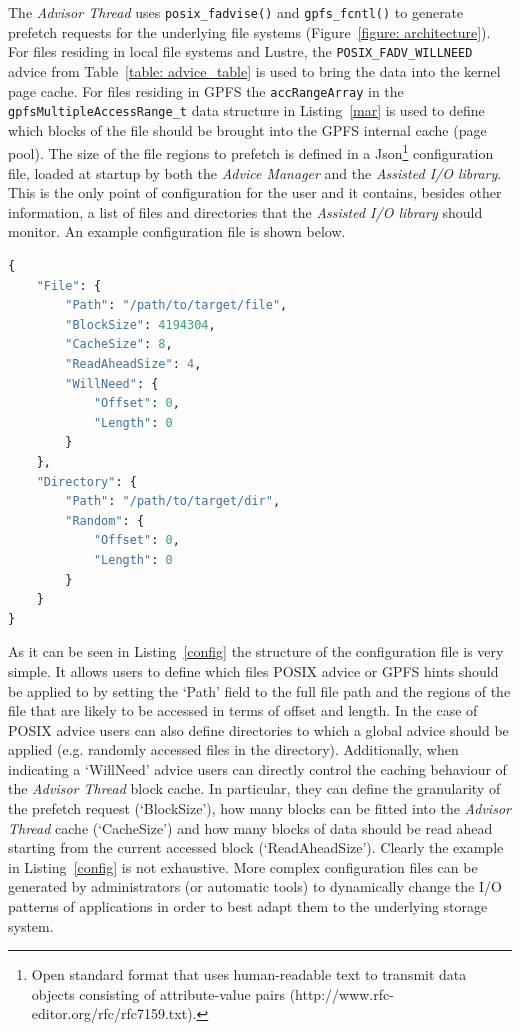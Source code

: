 The \textit{Advisor Thread} uses \texttt{posix\_fadvise()} and \texttt{gpfs\_fcntl()} to generate prefetch requests for the underlying file systems (Figure~\ref{figure: architecture}). For files residing in local file systems and Lustre, the \texttt{POSIX\_FADV\_WILLNEED} advice from Table~\ref{table: advice_table} is used to bring the data into the kernel page cache. For files residing in GPFS the \texttt{accRangeArray} in the \texttt{gpfsMultipleAccessRange\_t} data structure in Listing~\ref{mar} is used to define which blocks of the file should be brought into the GPFS internal cache (page pool). 
The size of the file regions to prefetch is defined in a Json\footnote{Open standard format that uses human-readable text to transmit data objects consisting of attribute-value pairs (http://www.rfc-editor.org/rfc/rfc7159.txt).} configuration file, loaded at startup by both the \textit{Advice Manager} and the \textit{Assisted I/O library}. This is the only point of configuration for the user and it contains, besides other information, a list of files and directories that the \textit{Assisted I/O library} should monitor. An example configuration file is shown below. 

\begin{lstlisting}[language=python, caption=Example of Json Configuration File]
{
    "File": {
        "Path": "/path/to/target/file",
        "BlockSize": 4194304,
        "CacheSize": 8,
        "ReadAheadSize": 4,
        "WillNeed": {
            "Offset": 0,
            "Length": 0
        }
    },
    "Directory": {
        "Path": "/path/to/target/dir",
        "Random": {
            "Offset": 0,
            "Length": 0
        }
    }
}
\end{lstlisting}
As it can be seen in Listing~\ref{config} the structure of the configuration file is very simple. It allows users to define which files POSIX advice or GPFS hints should be applied to by setting the `Path' field to the full file path and the regions of the file that are likely to be accessed in terms of offset and length. In the case of POSIX advice users can also define directories to which a global advice should be applied (e.g. randomly accessed files in the directory). Additionally, when indicating a `WillNeed' advice users can directly control the caching behaviour of the \textit{Advisor Thread} block cache. In particular, they can define the granularity of the prefetch request (`BlockSize'), how many blocks can be fitted into the \textit{Advisor Thread} cache (`CacheSize') and how many blocks of data should be read ahead starting from the current accessed block (`ReadAheadSize'). Clearly the example in Listing~\ref{config} is not exhaustive. More complex configuration files can be generated by administrators (or automatic tools) to dynamically change the I/O patterns of applications in order to best adapt them to the underlying storage system.

